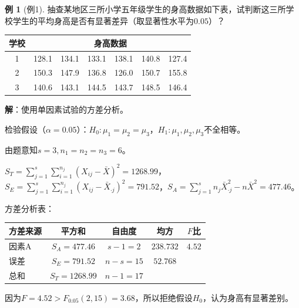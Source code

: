 \documentclass[11pt,a4paper]{report}
\theoremstyle{definition}
\newtheorem{example}{例}[chapter]
\theoremstyle{plain}
\begin{document}
\begin{example}[例1]
抽查某地区三所小学五年级学生的身高数据如下表，试判断这三所学校学生的平均身高是否有显著差异（取显著性水平为$0.05$）？
\begin{center}
\begin{tabular}{ccccccc}
\toprule
学校 & \multicolumn{6}{c}{身高数据} \\
\midrule
1 & 128.1 & 134.1 & 133.1 & 138.1 & 140.8 & 127.4 \\
2 & 150.3 & 147.9 & 136.8 & 126.0 & 150.7 & 155.8 \\
3 & 140.6 & 143.1 & 144.5 & 143.7 & 148.5 & 146.4 \\
\bottomrule
\end{tabular}
\end{center}

\textbf{解}：使用单因素试验的方差分析。

检验假设（$\alpha=0.05$）：$H_0:\mu_1=\mu_2=\mu_3$，$H_1:\mu_1,\mu_2,\mu_3$不全相等。

由题意知$s=3,n_1=n_2=n_3=6$。

$S_T=\sum_{j=1}^{s}\sum_{i=1}^{n_j}(X_{ij}-\bar{X})^2=1268.99$，$S_E=\sum_{j=1}^{s}\sum_{i=1}^{n_j}(X_{ij}-\bar{X}_{\cdot j})^2=791.52$，$S_A=\sum_{j=1}^{s}n_j\bar{X}_{\cdot j}^2-n\bar{X}^2=477.46$。

方差分析表：
\begin{center}
\begin{tabular}{@{}lcccc@{}}
\toprule
方差来源 & 平方和 & 自由度 & 均方 & $F$比 \\
\midrule
因素A & $S_A=477.46$ & $s-1=2$ & $238.732$ & $4.52$ \\
误差 & $S_E=791.52$ & $n-s=15$ & $52.768$ & \\
总和 & $S_T=1268.99$ & $n-1=17$ & & \\
\bottomrule
\end{tabular}
\end{center}

因为$F=4.52>F_{0.05}(2,15)=3.68$，所以拒绝假设$H_0$，认为身高有显著差别。
\end{example}
\end{document}
